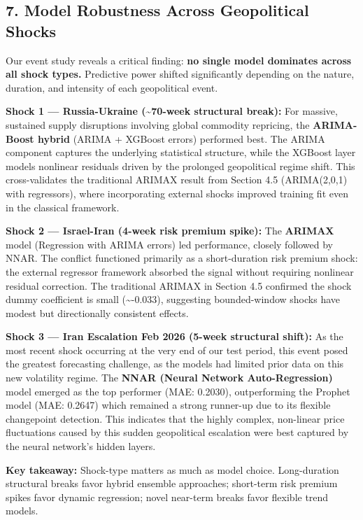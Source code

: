 \documentclass[
]{article}
\begin{document}
\subsection{7. Model Robustness Across Geopolitical
Shocks}\label{model-robustness-across-geopolitical-shocks}

Our event study reveals a critical finding: \textbf{no single model
dominates across all shock types.} Predictive power shifted
significantly depending on the nature, duration, and intensity of each
geopolitical event.

\textbf{Shock 1 --- Russia-Ukraine (\textasciitilde70-week structural
break):} For massive, sustained supply disruptions involving global
commodity repricing, the \textbf{ARIMA-Boost hybrid} (ARIMA + XGBoost
errors) performed best. The ARIMA component captures the underlying
statistical structure, while the XGBoost layer models nonlinear
residuals driven by the prolonged geopolitical regime shift. This
cross-validates the traditional ARIMAX result from Section 4.5
(ARIMA(2,0,1) with regressors), where incorporating external shocks
improved training fit even in the classical framework.

\textbf{Shock 2 --- Israel-Iran (4-week risk premium spike):} The
\textbf{ARIMAX} model (Regression with ARIMA errors) led performance,
closely followed by NNAR. The conflict functioned primarily as a
short-duration risk premium shock: the external regressor framework
absorbed the signal without requiring nonlinear residual correction. The
traditional ARIMAX in Section 4.5 confirmed the shock dummy coefficient
is small (\textasciitilde-0.033), suggesting bounded-window shocks have
modest but directionally consistent effects.

\textbf{Shock 3 --- Iran Escalation Feb 2026 (5-week structural shift):}
As the most recent shock occurring at the very end of our test period,
this event posed the greatest forecasting challenge, as the models had
limited prior data on this new volatility regime. The \textbf{NNAR
(Neural Network Auto-Regression)} model emerged as the top performer
(MAE: 0.2030), outperforming the Prophet model (MAE: 0.2647) which
remained a strong runner-up due to its flexible changepoint detection.
This indicates that the highly complex, non-linear price fluctuations
caused by this sudden geopolitical escalation were best captured by the
neural network's hidden layers.

\textbf{Key takeaway:} Shock-type matters as much as model choice.
Long-duration structural breaks favor hybrid ensemble approaches;
short-term risk premium spikes favor dynamic regression; novel near-term
breaks favor flexible trend models.
\end{document}
